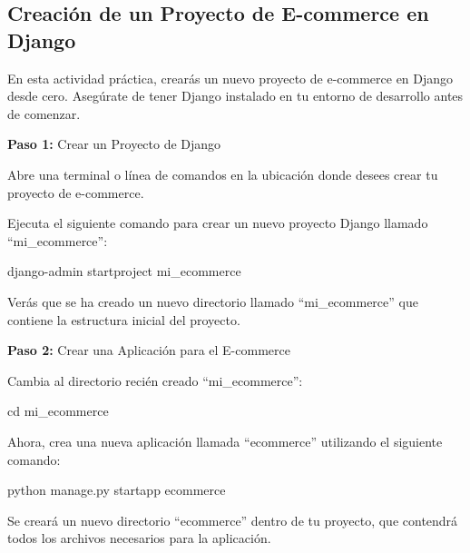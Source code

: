 \documentclass[
  letterpaper,
  DIV=11,
  numbers=noendperiod]{scrartcl}
\newenvironment{Shaded}{\begin{snugshade}}{\end{snugshade}}
\newcommand{\BuiltInTok}[1]{\textcolor[rgb]{0.00,0.23,0.31}{#1}}
\newcommand{\ExtensionTok}[1]{\textcolor[rgb]{0.00,0.23,0.31}{#1}}
\newcommand{\NormalTok}[1]{\textcolor[rgb]{0.00,0.23,0.31}{#1}}
\begin{document}
\hypertarget{creaciuxf3n-de-un-proyecto-de-e-commerce-en-django}{%
\subsection{Creación de un Proyecto de E-commerce en
Django}\label{creaciuxf3n-de-un-proyecto-de-e-commerce-en-django}}

En esta actividad práctica, crearás un nuevo proyecto de e-commerce en
Django desde cero. Asegúrate de tener Django instalado en tu entorno de
desarrollo antes de comenzar.

\textbf{Paso 1:} Crear un Proyecto de Django

Abre una terminal o línea de comandos en la ubicación donde desees crear
tu proyecto de e-commerce.

Ejecuta el siguiente comando para crear un nuevo proyecto Django llamado
``mi\_ecommerce'':

\begin{Shaded}
\begin{Highlighting}[]
\ExtensionTok{django{-}admin}\NormalTok{ startproject mi\_ecommerce}
\end{Highlighting}
\end{Shaded}

Verás que se ha creado un nuevo directorio llamado ``mi\_ecommerce'' que
contiene la estructura inicial del proyecto.

\textbf{Paso 2:} Crear una Aplicación para el E-commerce

Cambia al directorio recién creado ``mi\_ecommerce'':

\begin{Shaded}
\begin{Highlighting}[]
\BuiltInTok{cd}\NormalTok{ mi\_ecommerce}
\end{Highlighting}
\end{Shaded}

Ahora, crea una nueva aplicación llamada ``ecommerce'' utilizando el
siguiente comando:

\begin{Shaded}
\begin{Highlighting}[]
\ExtensionTok{python}\NormalTok{ manage.py startapp ecommerce}
\end{Highlighting}
\end{Shaded}

Se creará un nuevo directorio ``ecommerce'' dentro de tu proyecto, que
contendrá todos los archivos necesarios para la aplicación.
\end{document}
